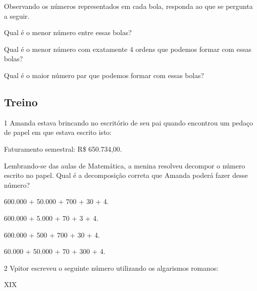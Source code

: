 Observando os números representados em cada bola, responda ao que se pergunta a seguir.

\begin{escolha}
\item
  Qual é o menor número entre essas bolas? 

\item
  Qual é o menor número com exatamente 4 ordens que podemos formar com essas bolas? 

\item
  Qual é o maior número par que podemos formar com essas bolas? 
\end{escolha}


\subsection{Treino}

\num{1} Amanda estava brincando no escritório de seu pai quando encontrou um
pedaço de papel em que estava escrito isto:

\begin{mdframed}[linewidth=2pt,linecolor=azul!20,backgroundcolor=azul!20,roundcorner=2pt]
Faturamento semestral: R\$ 650.734,00.
\end{mdframed}

Lembrando-se das aulas de Matemática, a menina resolveu decompor o número escrito
no papel. Qual é a decomposição correta que Amanda poderá fazer desse
número?

\begin{escolha}
\item
  600.000 + 50.000 + 700 + 30 + 4.
\item
  600.000 + 5.000 + 70 + 3 + 4.
\item
  600.000 + 500 + 700 + 30 + 4.
\item
  60.000 + 50.000 + 70 + 300 + 4.
\end{escolha}

\num{2} Vpitor escreveu o seguinte número utilizando os algarismos romanos:

\begin{center}
\begin{mdframed}[linewidth=2pt,linecolor=azul!20,backgroundcolor=azul!20,roundcorner=2pt]
XIX
\end{mdframed}
\end{center}

